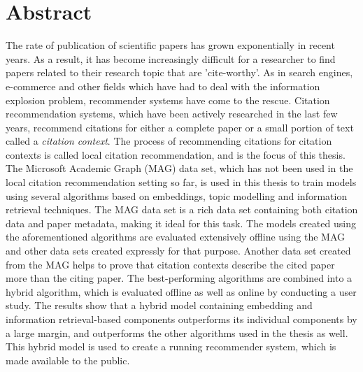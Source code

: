 \chapter*{Abstract}
The rate of publication of scientific papers has grown exponentially in recent years. As a result, it has become increasingly difficult for a researcher to find papers related to their research topic that are 'cite-worthy'. As in search engines, e-commerce and other fields which have had to deal with the information explosion problem, recommender systems have come to the rescue. Citation recommendation systems, which have been actively researched in the last few years, recommend citations for either a complete paper or a small portion of text called a \textit{citation context}. The process of recommending citations for citation contexts is called local citation recommendation, and is the focus of this thesis.
The Microsoft Academic Graph (MAG) data set, which has not been used in the local citation recommendation setting so far, is used in this thesis to train models using several algorithms based on embeddings, topic modelling and information retrieval techniques. The MAG data set is a rich data set containing both citation data and paper metadata, making it ideal for this task. 
The models created using the aforementioned algorithms are evaluated extensively offline using the MAG and other data sets created expressly for that purpose. Another data set created from the MAG helps to prove that citation contexts describe the cited paper more than the citing paper.
The best-performing algorithms are combined into a hybrid algorithm, which is evaluated offline as well as online by conducting a user study. The results show that a hybrid model containing embedding and information retrieval-based components outperforms its individual components by a large margin, and outperforms the other algorithms used in the thesis as well. This hybrid model is used to create a running recommender system, which is made available to the public.

